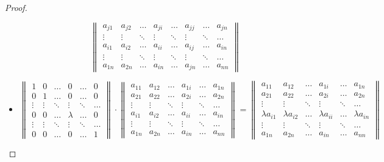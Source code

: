 \begin{proof}
\begin{itemize}
\begin{equation*}
\begin{Vmatrix}
	a_{j1} & a_{j2} & \ldots & a_{ji} & \ldots & a_{jj} & \ldots & a_{jn} \\
	\vdots & \vdots & \ddots & \vdots & \ddots & \vdots & \ddots & \ldots \\
	a_{i1} & a_{i2} & \ldots & a_{ii} & \ldots & a_{ij} & \ldots & a_{in} \\
	\vdots & \vdots & \ddots & \vdots & \ddots & \vdots & \ddots & \ldots \\
	a_{1n} & a_{2n} & \ldots & a_{in} & \ldots & a_{jn} & \ldots & a_{nn}
	\end{Vmatrix}
	\end{equation*}
	
	\item \begin{equation*}
	\begin{Vmatrix}
	1 & 0 & \ldots & 0 & \ldots & 0 \\
	0 & 1 & \ldots & 0 & \ldots & 0 \\
	\vdots & \vdots & \ddots & \vdots & \ddots & \ldots \\
	0 & 0 & \ldots & \lambda & \ldots & 0 \\
	\vdots & \vdots & \ddots & \vdots & \ddots & \ldots \\
	0 & 0 & \ldots & 0 & \ldots & 1
	\end{Vmatrix} \cdot
	\begin{Vmatrix}
	a_{11} & a_{12} & \ldots & a_{1i} & \ldots & a_{1n} \\
	a_{21} & a_{22} & \ldots & a_{2i} & \ldots & a_{2n} \\
	\vdots & \vdots & \ddots & \vdots & \ddots & \ldots \\
	a_{i1} & a_{i2} & \ldots & a_{ii} & \ldots & a_{in} \\
	\vdots & \vdots & \ddots & \vdots & \ddots & \ldots \\
	a_{1n} & a_{2n} & \ldots & a_{in} & \ldots & a_{nn}
	\end{Vmatrix} =
	\begin{Vmatrix}
	a_{11} & a_{12} & \ldots & a_{1i} & \ldots & a_{1n} \\
	a_{21} & a_{22} & \ldots & a_{2i} & \ldots & a_{2n} \\
	\vdots & \vdots & \ddots & \vdots & \ddots & \ldots \\
	\lambda a_{i1} & \lambda a_{i2} & \ldots & \lambda a_{ii} & \ldots & \lambda a_{in} \\
	\vdots & \vdots & \ddots & \vdots & \ddots & \ldots \\
	a_{1n} & a_{2n} & \ldots & a_{in} & \ldots & a_{nn}
	\end{Vmatrix}
	\end{equation*}
	

\end{itemize}
\end{proof}
